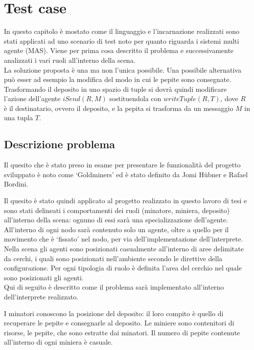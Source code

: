 \chapter{Test case}
In questo capitolo è mostato come il linguaggio e l'incarnazione realizzati sono stati applicati ad uno scenario di test noto per quanto riguarda i sistemi multi agente (MAS).
Viene per prima cosa descritto il problema e successivamente analizzati i vari ruoli all'interno della scena.
\\
La soluzione proposta è una ma non l'unica possibile. Una possibile alternativa può esser ad esempio la modifica del modo in cui le pepite sono consegnate. Trasformando il deposito in uno spazio di tuple si dovrà quindi modificare l'azione dell'agente $iSend(R,M)$ sostituendola con $writeTuple(R,T)$, dove $R$ è il destinatario, ovvero il deposito, e la pepita si trasforma da un messaggio $M$ in una tupla $T$.

\section{Descrizione problema}
Il quesito che è stato preso in esame per presentare le funzionalità del progetto sviluppato è noto come `Goldminers' ed è stato definito da Jomi H\"ubner e Rafael Bordini.

\medskip
{}
\medskip

Il quesito è stato quindi applicato al progetto realizzato in questo lavoro di tesi e sono stati delineati i comportamenti dei ruoli (minatore, miniera, deposito) all'interno della scena: ognuno di essi sarà una specializzazione dell'agente. All'interno di ogni nodo sarà contenuto solo un agente, oltre a quello per il movimento che è `fissato' nel nodo, per via dell'implementazione dell'interprete.
\\
Nella scena gli agenti sono posizionati casualmente all'interno di aree delimitate da cerchi, i quali sono posizionati nell'ambiente secondo le direttive della configurazione. Per ogni tipologia di ruolo è definita l'area del cerchio nel quale sono posizionati gli agenti.
\\
Qui di seguito è descritto come il problema sarà implementato all'interno dell'interprete realizzato.

I minatori conoscono la posizione del deposito: il loro compito è quello di recuperare le pepite e consegnarle al deposito.
Le miniere sono contenitori di risorse, le pepite, che sono estratte dai minatori. Il numero di pepite contenute all'interno di ogni miniera è casuale.

